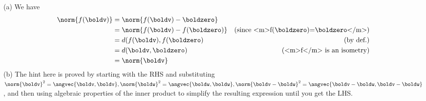 \begin{solution}
\noindent
(a) We have 
\begin{align*}
\norm{f(\boldv)}&=\norm{f(\boldv)-\boldzero}\\
&=\norm{f(\boldv)-f(\boldzero)} &\text{(since <m>f(\boldzero)=\boldzero</m>)}\\
&=d(f(\boldv),f(\boldzero) &\text{(by def.)}\\
&=d(\boldv, \boldzero) &\text{(<m>f</m> is an isometry)}\\
&=\norm{\boldv}
\end{align*}
(b) The hint here is proved by starting with the RHS and substituting $\norm{\boldv}^2=\angvec{\boldv, \boldv}, \norm{\boldw}^2=\angvec{\boldw,\boldw}, \norm{\boldv-\boldw}^2=\angvec{\boldv-\boldw,\boldv-\boldw}$, and then using algebraic properties of the inner product to simplify the resulting expression until you get the LHS. 


\end{solution}
